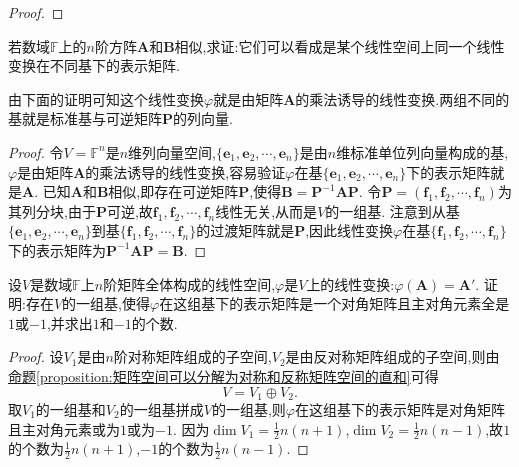 \documentclass[../../main.tex]{subfiles}%
\begin{document}
\begin{proof}
\end{proof}

\begin{proposition}\label{proposition:相似矩阵可看作一个线性变换在不同基下的表示矩阵}
若数域\(\mathbb{F}\)上的\(n\)阶方阵\(\boldsymbol{A}\)和\(\boldsymbol{B}\)相似,求证:它们可以看成是某个线性空间上同一个线性变换在不同基下的表示矩阵.
\end{proposition}
\begin{note}
由下面的证明可知这个线性变换\(\varphi\)就是由矩阵\(\boldsymbol{A}\)的乘法诱导的线性变换.两组不同的基就是标准基与可逆矩阵\(\boldsymbol{P}\)的列向量.
\end{note}
\begin{proof}

令\(V = \mathbb{F}^n\)是\(n\)维列向量空间,\(\{\boldsymbol{e}_1,\boldsymbol{e}_2,\cdots,\boldsymbol{e}_n\}\)是由\(n\)维标准单位列向量构成的基,\(\varphi\)是由矩阵\(\boldsymbol{A}\)的乘法诱导的线性变换,容易验证\(\varphi\)在基\(\{\boldsymbol{e}_1,\boldsymbol{e}_2,\cdots,\boldsymbol{e}_n\}\)下的表示矩阵就是\(\boldsymbol{A}\). 已知\(\boldsymbol{A}\)和\(\boldsymbol{B}\)相似,即存在可逆矩阵\(\boldsymbol{P}\),使得\(\boldsymbol{B}=\boldsymbol{P}^{-1}\boldsymbol{A}\boldsymbol{P}\).
令\(\boldsymbol{P}=(\boldsymbol{f}_1,\boldsymbol{f}_2,\cdots,\boldsymbol{f}_n)\)为其列分块,由于\(\boldsymbol{P}\)可逆,故\(\boldsymbol{f}_1,\boldsymbol{f}_2,\cdots,\boldsymbol{f}_n\)线性无关,从而是\(V\)的一组基. 注意到从基\(\{\boldsymbol{e}_1,\boldsymbol{e}_2,\cdots,\boldsymbol{e}_n\}\)到基\(\{\boldsymbol{f}_1,\boldsymbol{f}_2,\cdots,\boldsymbol{f}_n\}\)的过渡矩阵就是\(\boldsymbol{P}\),因此线性变换\(\varphi\)在基\(\{\boldsymbol{f}_1,\boldsymbol{f}_2,\cdots,\boldsymbol{f}_n\}\)下的表示矩阵为\(\boldsymbol{P}^{-1}\boldsymbol{A}\boldsymbol{P}=\boldsymbol{B}\). 

\end{proof}

\begin{example}
设\(V\)是数域\(\mathbb{F}\)上\(n\)阶矩阵全体构成的线性空间,\(\varphi\)是\(V\)上的线性变换:\(\varphi(\boldsymbol{A})=\boldsymbol{A}'\). 证明:存在\(V\)的一组基,使得\(\varphi\)在这组基下的表示矩阵是一个对角矩阵且主对角元素全是\(1\)或\(-1\),并求出\(1\)和\(-1\)的个数.
\end{example}
\begin{proof}

设\(V_1\)是由\(n\)阶对称矩阵组成的子空间,\(V_2\)是由反对称矩阵组成的子空间,则由\hyperref[proposition:矩阵空间可以分解为对称和反称矩阵空间的直和]{命题\ref{proposition:矩阵空间可以分解为对称和反称矩阵空间的直和}}可得
\[
V = V_1\oplus V_2.
\]
取\(V_1\)的一组基和\(V_2\)的一组基拼成\(V\)的一组基,则\(\varphi\)在这组基下的表示矩阵是对角矩阵且主对角元素或为\(1\)或为\(-1\). 因为\(\dim V_1=\frac{1}{2}n(n + 1)\),\(\dim V_2=\frac{1}{2}n(n - 1)\),故\(1\)的个数为\(\frac{1}{2}n(n + 1)\),\(-1\)的个数为\(\frac{1}{2}n(n - 1)\).

\end{proof}
\end{document}
